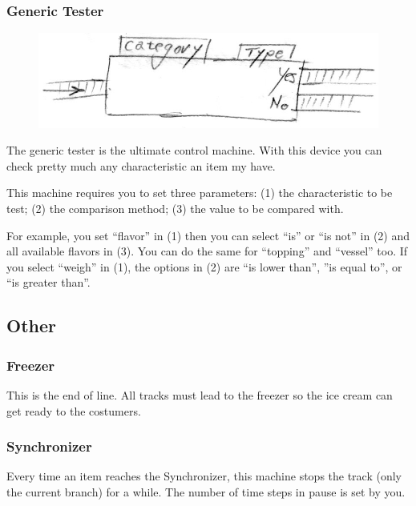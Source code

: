 \documentclass[a4paper]{scrartcl}
\begin{document}
        \subsubsection{Generic Tester}
            \begin{minipage}[t][6.1em][t]{\textwidth}
                \begin{figure}
                    \vspace{-20pt}
                    \includegraphics[scale=1]{devices/generic_conditional}
                    \vspace{-20pt}
                \end{figure}

            The generic tester is the ultimate control machine. With this device
            you can check pretty much any characteristic an item my have.

            This machine requires you to set three parameters: (1) the
            characteristic to be test; (2) the comparison method; (3) the value
            to be compared with.
            \end{minipage}

            For example, you set ``flavor'' in (1) then you can select ``is'' or
            ``is not'' in (2) and all available flavors in (3). You can do the
            same for ``topping'' and ``vessel'' too. If you select ``weigh'' in
            (1), the options in (2) are ``is lower than'', ''is equal to'', or
            ``is greater than''.

    \subsection{Other}
        \subsubsection{Freezer}
            This is the end of line. All tracks must lead to the freezer so the
            ice cream can get ready to the costumers.

        \subsubsection{Synchronizer}
            Every time an item reaches the Synchronizer, this machine stops the
            track (only the current branch) for a while. The number of time
            steps in pause is set by you.
\end{document}
